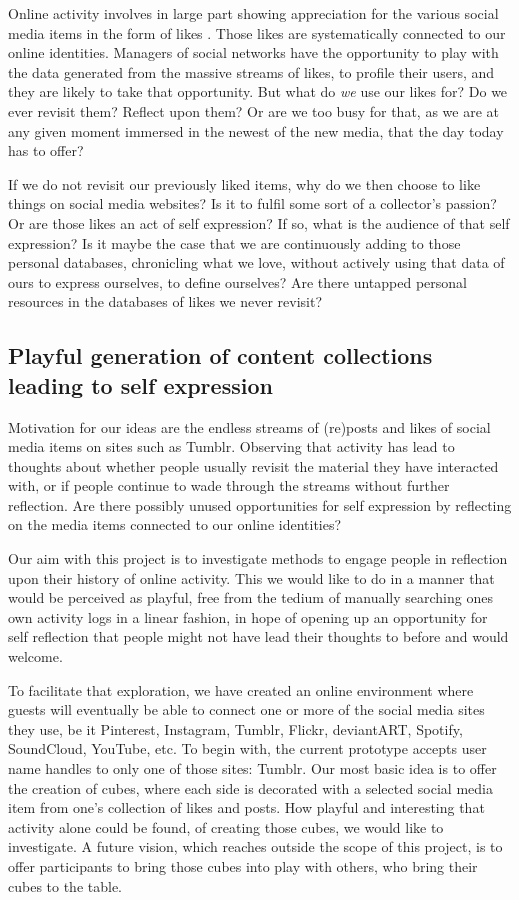\documentclass[]{article}
\begin{document}
Online activity involves in large part showing appreciation for the various social media items in the form of likes \cite{LM11}.  Those likes are systematically connected to our online identities.  Managers of social networks have the opportunity to play with the data generated from the massive streams of likes, to profile their users, and they are likely to take that opportunity.  
But what do \textit{we} use our likes for?  Do we ever revisit them?  Reflect upon them?  Or are we too busy for that, as we are at any given moment immersed in the newest of the new media, that the day today has to offer?

If we do not revisit our previously liked items, why do we then choose to like things on social media websites?  Is it to fulfil some sort of a collector’s passion?  Or are those likes an act of self expression?  If so, what is the audience of that self expression?  Is it maybe the case that we are continuously adding to those personal databases, chronicling what we love, without actively using that data of ours to express ourselves, to define ourselves?  Are there untapped personal resources in the databases of likes we never revisit?


\subsection{Playful generation of content collections leading to self expression}

Motivation for our ideas are the endless streams of (re)posts and likes of social media items on sites such as Tumblr.  Observing that activity has lead to thoughts about whether people usually revisit the material they have interacted with, or if people continue to wade through the streams without further reflection.  Are there possibly unused opportunities for self expression by reflecting on the media items connected to our online identities? 

Our aim with this project is to investigate methods to engage people in reflection upon their history of online activity.  This we would like to do in a manner that would be perceived as playful, free from the tedium of manually searching ones own activity logs in a linear fashion, in hope of opening up an opportunity for self reflection that people might not have lead their thoughts to before and would welcome.

To facilitate that exploration, we have created an online environment where guests will eventually be able to connect one or more of the social media sites they use, be it Pinterest, Instagram, Tumblr, Flickr, deviantART, Spotify, SoundCloud, YouTube, etc.  To begin with, the current prototype accepts user name handles to only one of those sites:  Tumblr.  Our most basic idea is to offer the creation of cubes, where each side is decorated with a selected social media item from one's collection of likes and posts.  How playful and interesting that activity alone could be found, of creating those cubes, we would like to investigate.  A future vision, which reaches outside the scope of this project, is to offer participants to bring those cubes into play with others, who bring their cubes to the table.
\end{document}
